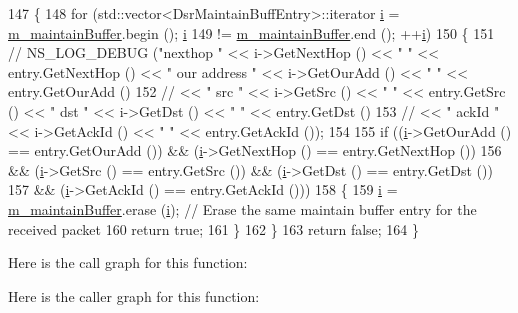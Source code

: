 \begin{DoxyCode}
147 \{
148   \textcolor{keywordflow}{for} (std::vector<DsrMaintainBuffEntry>::iterator \hyperlink{bernuolliDistribution_8m_a6f6ccfcf58b31cb6412107d9d5281426}{i} = \hyperlink{classns3_1_1dsr_1_1DsrMaintainBuffer_a942fc86793c5a6f538a9f0bd69709ce9}{m\_maintainBuffer}.begin (); 
      \hyperlink{bernuolliDistribution_8m_a6f6ccfcf58b31cb6412107d9d5281426}{i}
149        != \hyperlink{classns3_1_1dsr_1_1DsrMaintainBuffer_a942fc86793c5a6f538a9f0bd69709ce9}{m\_maintainBuffer}.end (); ++\hyperlink{bernuolliDistribution_8m_a6f6ccfcf58b31cb6412107d9d5281426}{i})
150     \{
151 \textcolor{comment}{//      NS\_LOG\_DEBUG ("nexthop " << i->GetNextHop () << " " << entry.GetNextHop () << " our address " <<
       i->GetOurAdd () << " " << entry.GetOurAdd ()}
152 \textcolor{comment}{//                               << " src " << i->GetSrc () << " " << entry.GetSrc () << " dst " <<
       i->GetDst () << " " << entry.GetDst ()}
153 \textcolor{comment}{//                               << " ackId " << i->GetAckId () << " " << entry.GetAckId ());}
154 
155       \textcolor{keywordflow}{if} ((\hyperlink{bernuolliDistribution_8m_a6f6ccfcf58b31cb6412107d9d5281426}{i}->GetOurAdd () == entry.GetOurAdd ()) && (\hyperlink{bernuolliDistribution_8m_a6f6ccfcf58b31cb6412107d9d5281426}{i}->GetNextHop () == entry.GetNextHop ())
156           && (\hyperlink{bernuolliDistribution_8m_a6f6ccfcf58b31cb6412107d9d5281426}{i}->GetSrc () == entry.GetSrc ()) && (\hyperlink{bernuolliDistribution_8m_a6f6ccfcf58b31cb6412107d9d5281426}{i}->GetDst () == entry.GetDst ())
157           && (\hyperlink{bernuolliDistribution_8m_a6f6ccfcf58b31cb6412107d9d5281426}{i}->GetAckId () == entry.GetAckId ()))
158         \{
159           \hyperlink{bernuolliDistribution_8m_a6f6ccfcf58b31cb6412107d9d5281426}{i} = \hyperlink{classns3_1_1dsr_1_1DsrMaintainBuffer_a942fc86793c5a6f538a9f0bd69709ce9}{m\_maintainBuffer}.erase (\hyperlink{bernuolliDistribution_8m_a6f6ccfcf58b31cb6412107d9d5281426}{i});   \textcolor{comment}{// Erase the same maintain buffer entry for
       the received packet}
160           \textcolor{keywordflow}{return} \textcolor{keyword}{true};
161         \}
162     \}
163   \textcolor{keywordflow}{return} \textcolor{keyword}{false};
164 \}
\end{DoxyCode}


Here is the call graph for this function\+:




Here is the caller graph for this function\+:


